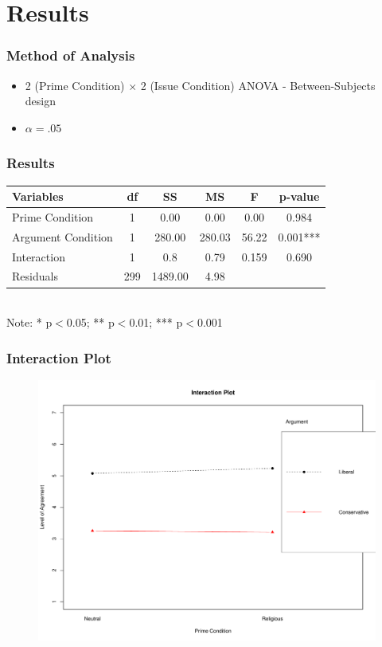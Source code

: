 \documentclass[14pt]{beamer}
\newcommand\tb{\textbf}
\begin{document}
\section{Results}

\begin{frame}
\frametitle{Method of Analysis}
\begin{itemize}
	\item 2 (Prime Condition) $\times$ 2 (Issue Condition) ANOVA - Between-Subjects design
	\item $\alpha = .05$
\end{itemize}
\end{frame}

\begin{frame}
\frametitle{Results}
\begin{table}
	\centering
	\small
	\begin{tabular}{lccccc}
		\hline
		\tb{Variables}&\tb{df}&\tb{SS}&\tb{MS}&\tb{F}&\tb{p-value}\\
		\hline
		Prime Condition&1&0.00&0.00&0.00&0.984\\
		Argument Condition&1&280.00&280.03&56.22&0.001***\\
		Interaction&1&0.8&0.79&0.159&0.690\\
		Residuals&299&1489.00&4.98&&\\
		\hline
	\end{tabular}\\
Note: * p$<$0.05; ** p$<$0.01; *** p$<$0.001
\end{table}
\end{frame}

\begin{frame}
\frametitle{Interaction Plot}
\begin{figure}
	\centering
	{\includegraphics[width=.8\textwidth]{InteractionPlot}}
\end{figure}
\end{frame}
\end{document}
